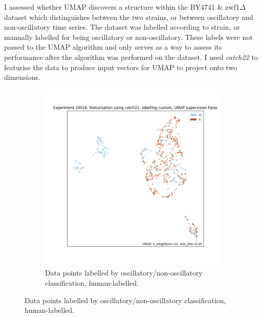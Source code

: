 I assessed whether UMAP discovers a structure within the BY4741 \& zwf1$\Delta$ dataset which distinguishes between the two strains, or between oscillatory and non-oscillatory time series.
The dataset was labelled according to strain, or manually labelled for being oscillatory or non-oscillatory.
These labels were not passed to the UMAP algorithm and only serves as a way to assess its performance after the algorithm was performed on the dataset.
I used \textit{catch22} to featurise the data to produce input vectors for UMAP to project onto two dimensions.

\begin{figure}
  \centering
  \begin{subfigure}[t]{0.7\textwidth}
  \centering
    \includegraphics[width=\linewidth]{Figure_15}
    \caption{
      Data points labelled by oscillatory/non-oscillatory classification, human-labelled.
    }
    \label{fig:umap-osc}
  \end{subfigure}


\end{figure}
